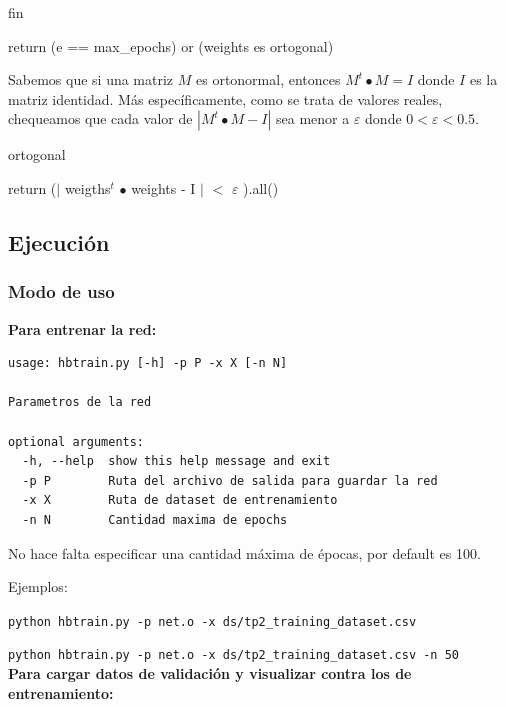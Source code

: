 \begin{algorithm}[H]
\caption{fin}
\begin{algorithmic}
	\State return (e == max\_epochs) or (weights es ortogonal)
\end{algorithmic}
\end{algorithm}

Sabemos que si una matriz $M$ es ortonormal, entonces $M^t \bullet M = I$ donde $I$ es la matriz identidad. Más específicamente, como se trata de valores reales, chequeamos que cada valor de $|M^t \bullet M - I|$ sea menor a $ \varepsilon $ donde $0 < \varepsilon < 0.5$.

\begin{algorithm}[H]
\caption{ortogonal}
\begin{algorithmic}
	\State return ($|$ weigths$^t$ $\bullet$ weights - I $|$ $<$ $\varepsilon$ ).all()
\end{algorithmic}
\end{algorithm}

\subsection{Ejecución}

\subsubsection{Modo de uso}

\textbf{Para entrenar la red:}

\begin{lstlisting}[style=bash]
usage: hbtrain.py [-h] -p P -x X [-n N]

Parametros de la red

optional arguments:
  -h, --help  show this help message and exit
  -p P        Ruta del archivo de salida para guardar la red
  -x X        Ruta de dataset de entrenamiento
  -n N        Cantidad maxima de epochs
\end{lstlisting}

No hace falta especificar una cantidad máxima de épocas, por default es 100.

Ejemplos: 

\noindent\texttt{python hbtrain.py -p net.o -x ds/tp2\_training\_dataset.csv}

\noindent\texttt{python hbtrain.py -p net.o -x ds/tp2\_training\_dataset.csv -n 50} \\

\textbf{Para cargar datos de validación y visualizar contra los de entrenamiento:}

